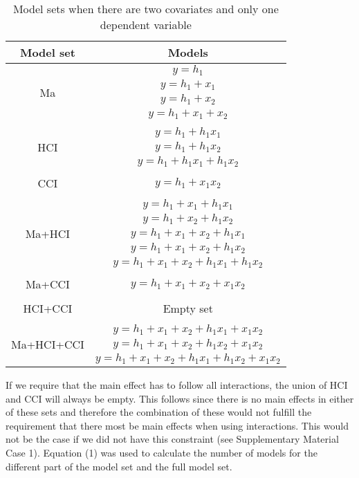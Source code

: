\begin{table}[]
\caption{}
\caption*{\footnotesize Model sets when there are two covariates and only one dependent variable}
\centering
\begin{tabular}{cc}
\toprule
Model set & Models \\ 
\midrule
\multirow{4}{*}{Ma} & $y=h_1$ \\ & $y=h_1+x_1$ \\ & $y=h_1+x_2$ \\ & $y=h_1+x_1+x_2$  \\ & \\
\multirow{3}{*}{HCI} & $y=h_1+h_1x_1$ \\ & $y=h_1+h_1x_2$ \\ & $y=h_1+h_1x_1+h_1x_2$  \\& \\
CCI & $y=h_1+x_1x_2$ \\ & \\
\multirow{5}{*}{Ma+HCI} & $y=h_1+x_1+h_1x_1$  \\ & $y=h_1+x_2+h_1x_2$  \\& $y=h_1+x_1+x_2+h_1x_1$  \\& $y=h_1+x_1+x_2+h_1x_2$  \\& $y=h_1+x_1+x_2+h_1x_1+h_1x_2$ \\ & \\
Ma+CCI & $y=h_1+x_1+x_2+x_1x_2$ \\ & \\
HCI+CCI & Empty set \\ & \\
\multirow{3}{*}{Ma+HCI+CCI} & $y=h_1+x_1+x_2+h_1x_1+x_1x_2$ \\ & $y=h_1+x_1+x_2+h_1x_2+x_1x_2$ \\ & $y=h_1+x_1+x_2+h_1x_1+h_1x_2+x_1x_2$ \\
\bottomrule
\end{tabular}
\end{table}


If we require that the main effect has to follow all interactions, the union of HCI and CCI will always be empty. This follows since there is no main effects in either of these sets and therefore the combination of these would not fulfill the requirement that there most be main effects when using interactions. This would not be the case if we did not have this constraint (see Supplementary Material Case 1). Equation (1) was used to calculate the number of models for the different part of the model set and the full model set. \\

